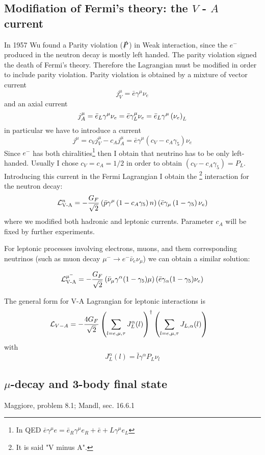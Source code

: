 \documentclass[TheoreticalPhy_ModB.tex]{subfiles}
\begin{document}
\subsection{Modifiation of Fermi's theory: the $V$ - $A$ current}
In 1957 Wu found a Parity violation ($\slashed P$) in Weak interaction, since the $e^-$ produced in the neutron decay is mostly left handed. The parity violation signed the death of Fermi's theory. Therefore the Lagrangian must be modified in order to include parity violation. Parity violation is obtained by a mixture of vector current
\[j_V^\mu=\bar e\gamma^\mu \nu_e\]
and an axial current
\[j^\mu_A=\bar e_L\gamma^\mu\nu_e=\bar e\gamma^\mu_L\nu_e=\bar e_L\gamma^\mu\left(\nu_e\right)_L\]
in particular we have to introduce a current
\[j^\mu=c_Vj^\mu_V-c_Aj^\mu_A=\bar e\gamma^\mu(c_V-c_A\gamma_5)\nu_e\]
Since $e^-$ has both chiralities\footnote{In QED $\bar e\gamma^\mu e=\bar e_R\gamma^\mu e_R+\bar e+L\gamma^\mu e_L$} then I obtain that neutrino has to be only left-handed. Usually I chose $c_V=c_A=1/2$ in order to obtain $(c_V-c_A\gamma_5)=P_L$. Introducing this current in the Fermi Lagrangian I obtain the \footnote{It is said "V minus A".} interaction for the neutron decay:
\[\mathcal L_{\text{V-A}}^n=-\frac {G_F}{\sqrt2} \left(\bar p\gamma^\mu\left(1-c_A\gamma_5\right) n\right)\left(\bar e \gamma_\mu\left(1-\gamma_5\right)\nu_e\right)\]
where we modified both hadronic and leptonic currents. Parameter $c_A$ will be fixed by further experiments.

For leptonic processes involving electrons, muons, and them corresponding neutrinos (such as muon decay $\mu^-\to e^-\bar\nu_e\nu_\mu$) we can obtain a similar solution:

\[\mathcal L_{\text{V-A}}^{\mu^-}=-\frac {G_F}{\sqrt2} \left(\bar \nu_\mu\gamma^\alpha (1-\gamma_5)\mu\right)\left(\bar e \gamma_\alpha (1-\gamma_5)\nu_e\right)\]

The general form for V-A Lagrangian for leptonic interactions is
\begin{align*}
\mathcal L_{V-A}
&=-\frac{4G_F}{\sqrt2}\left(\sum_{l=e,\mu,\tau}J_L^{\alpha}(l)\right)^\dagger\left(\sum_{l=e,\mu,\tau}J_{L,\alpha}(l)\right)
\end{align*}
with
\[J_L^{\alpha}(l)=\bar l\gamma^\alpha P_L\nu_l\]

\subsection{$\mu$-decay and 3-body final state}
\textsf{Maggiore, problem 8.1; Mandl, sec. 16.6.1}\\
\end{document}
